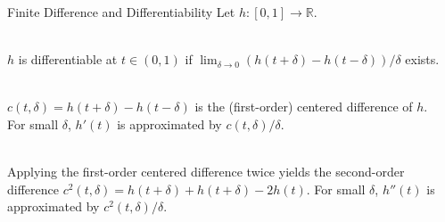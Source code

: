 \begin{frame}{Finite Difference and Differentiability}
    \vspace{-1cm}
    Let $h: [0, 1] \to \mathbb{R}$.

    \vspace{0.25cm}
    \begin{paragraph} \\
        \quad $h$ is differentiable at $t \in (0, 1)$ if
        $\lim_{\delta \to 0} (h(t + \delta) - h(t - \delta)) / \delta$ exists.
    \end{paragraph}

    \vspace{0.5cm}
    \begin{paragraph} \\
        \quad $c(t, \delta) = h(t + \delta) - h(t - \delta)$ is the (first-order)
        centered difference of $h$.\\
        \quad For small $\delta$, $h'(t)$ is approximated by $c(t, \delta) / \delta$.
    \end{paragraph}

    \vspace{0.5cm}
    \begin{paragraph} \\
        \quad Applying the first-order centered difference twice yields the second-order\\
        \quad difference $c^2(t, \delta) = h(t + \delta) + h(t + \delta) - 2h(t)$. For small
        $\delta$, $h''(t)$ is\\ \quad approximated by $c^2(t, \delta) / \delta$.
    \end{paragraph}

\end{frame}
